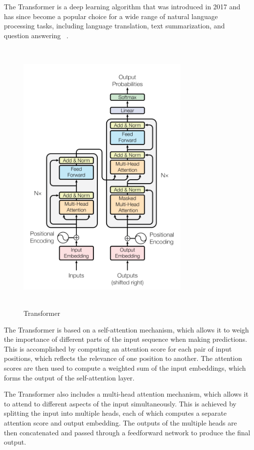 \documentclass[final]{cvpr}
\begin{document}
The Transformer is a deep learning algorithm that was introduced in 2017 and has since become a popular choice for a wide range of natural language processing tasks, including language translation, text summarization, and question answering ~\cite{Authors05}.


\hspace*{-0.9in}
\begin{figure}[h]
   \centering
   \includegraphics[width=8.5cm, height=14cm]{transformer.png}
   \caption{Transformer}
\end{figure}

The Transformer is based on a self-attention mechanism, which allows it to weigh the importance of different parts of the input sequence when making predictions. This is accomplished by computing an attention score for each pair of input positions, which reflects the relevance of one position to another. The attention scores are then used to compute a weighted sum of the input embeddings, which forms the output of the self-attention layer.

The Transformer also includes a multi-head attention mechanism, which allows it to attend to different aspects of the input simultaneously. This is achieved by splitting the input into multiple heads, each of which computes a separate attention score and output embedding. The outputs of the multiple heads are then concatenated and passed through a feedforward network to produce the final output.
\end{document}
